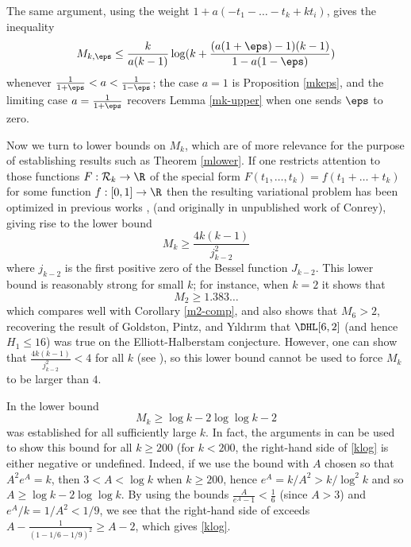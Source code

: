 \begin{remark} The same argument, using the weight $1 + a(-t_1-\dots-t_k + kt_i)$, gives the inequality
$$ M_{k,\eps} \leq \frac{k}{a(k-1)} \log(k + \frac{(a(1+\eps)-1)(k-1)}{1-a(1-\eps)} )$$
whenever $\frac{1}{1+\eps} < a < \frac{1}{1-\eps}$; the case $a=1$ is Proposition \ref{mkeps}, and the limiting case $a=\frac{1}{1+\eps}$ recovers Lemma \ref{mk-upper} when one sends $\eps$ to zero.
\end{remark}


Now we turn to lower bounds on $M_k$, which are of more relevance for the purpose of establishing results such as Theorem \ref{mlower}.  If one restricts attention to those functions $F: {\mathcal R}_k \to \R$ of the special form $F(t_1,\dots,t_k) = f(t_1+\dots+t_k)$ for some function $f: [0,1] \to \R$ then the resulting variational problem has been optimized in previous works \cite{revesz}, \cite{polymath8a} (and originally in unpublished work of Conrey), giving rise to the lower bound
$$ M_k \geq \frac{4k(k-1)}{j_{k-2}^2}$$
where $j_{k-2}$ is the first positive zero of the Bessel function $J_{k-2}$.  This lower bound is reasonably strong for small $k$; for instance, when $k=2$ it shows that
$$ M_2 \geq 1.383\dots$$
which compares well with Corollary \ref{m2-comp}, and also shows that $M_6 > 2$, recovering the result of Goldston, Pintz, and Y{\i}ld{\i}r{\i}m that $\DHL[6,2]$ (and hence $H_1 \leq 16$) was true on the Elliott-Halberstam conjecture.  However, one can show that $\frac{4k(k-1)}{j_{k-2}^2} < 4$ for all $k$ (see \cite{sound}), so this lower bound cannot be used to force $M_k$ to be larger than $4$.

In \cite{maynard-new} the lower bound
\begin{equation}\label{klog}
 M_k \geq \log k - 2\log\log k - 2
\end{equation}
was established for all sufficiently large $k$.  In fact, the arguments in \cite{maynard-new} can be used to show this bound for all $k \geq 200$ (for $k<200$, the right-hand side of \eqref{klog} is either negative or undefined.  Indeed, if we use the bound \cite[(8.17)]{maynard-new} with $A$ chosen so that $A^2 e^A = k$, then $3 < A < \log k$ when $k \geq 200$, hence $e^A = k/A^2 > k / \log^2 k$ and so $A \geq \log k - 2 \log\log k$.  By using the bounds $\frac{A}{e^A-1} < \frac{1}{6}$ (since $A >3$) and $e^A/k = 1/A^2 < 1/9$, we see that the right-hand side of \cite[(8.17)]{maynard-new} exceeds $A - \frac{1}{(1-1/6 - 1/9)^2} \geq A-2$, which gives \eqref{klog}.

